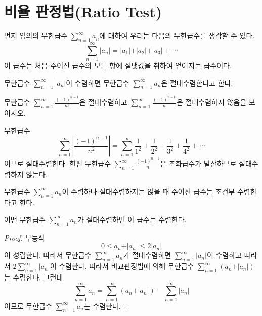 \documentclass[11pt, a4paper]{book}
\begin{document}
\section{비율 판정법(Ratio Test)}
먼저 임의의 무한급수 $\displaystyle \sum_{n=1}^{\infty}a_{n}$에 대하여 우리는 다음의 무한급수를 생각할 수 있다.
\begin{equation*}
	\sum_{n=1}^{\infty}\vert a_n \vert = \vert a_1 \vert + \vert a_2 \vert + \vert a_3 \vert + \, \cdots 
\end{equation*}
이 급수는 처음 주어진 급수의 모든 항에 절댓값을 취하여 얻어지는 급수이다.

\begin{definition}[절대수렴]
	무한급수 $\displaystyle \sum_{n=1}^{\infty}\vert a_n \vert$이 수렴하면 무한급수 $\displaystyle \sum_{n=1}^{\infty}a_{n}$은 {\color{red}절대수렴}한다고 한다.
\end{definition}
\vspace{1em}
\begin{example}
	무한급수 $\displaystyle \sum_{n=1}^{\infty}\frac{(-1)^{n-1}}{n^{2}}$은 절대수렴하고 $\displaystyle \sum_{n=1}^{\infty}\frac{(-1)^{n-1}}{n}$은 절대수렴하지 않음을 보이시오.
	\begin{solution}
		무한급수
		\begin{equation*}
			\sum_{n=1}^{\infty}\left| \frac{(-1)^{n-1}}{n^{2}}\right|  =\sum_{n=1}^{\infty} \frac{1}{1^2} +\frac{1}{2^2} +\frac{1}{3^{2}} +\frac{1}{4^2} + \, \cdots
		\end{equation*}
	이므로 절대수렴한다. 한편 무한급수 $\displaystyle \sum_{n=1}^{\infty}\frac{(-1)^{n-1}}{n}$은 조화급수가 발산하므로 절대수렴하지 않는다.
	\end{solution}
\end{example}
\vspace{1em}
\begin{definition}[조건부 수렴]
	무한급수 $\displaystyle \sum_{n=1}^{\infty}a_{n}$이 수렴하나 절대수렴하지는 않을 때 주어진 급수는 {\color{red}조건부 수렴}한다고 한다.
\end{definition}
\vspace{1em}
\begin{theorem}
	어떤 무한급수 $\displaystyle \sum_{n=1}^{\infty}a_{n}$가 절대수렴하면 이 급수는 수렴한다.
\end{theorem}
\begin{proof}
	부등식
	\begin{equation*}
		0 \le a_n + \vert a_n \vert \le 2\vert a_n \vert
	\end{equation*}
이 성립한다. 따라서 무한급수 $\displaystyle \sum_{n=1}^{\infty}a_{n}$가 절대수렴하면 $\displaystyle \sum_{n=1}^{\infty}\vert a_n \vert$이 수렴하고 따라서 $2 \displaystyle \sum_{n=1}^{\infty}\vert a_n \vert$이 수렴한다. 따라서 비교판정법에 의해 무한급수 $\displaystyle \sum_{n=1}^{\infty}\left(a_n + \vert a_n \vert \right)$는 수렴한다. 그런데
\begin{equation*}
	\sum_{n=1}^{\infty}a_{n} =\sum_{n=1}^{\infty}\left(a_n + \vert a_n \vert \right) - \sum_{n=1}^{\infty}\vert a_n \vert
\end{equation*}
이므로 무한급수 $\displaystyle \sum_{n=1}^{\infty}a_{n}$는 수렴한다.
\end{proof}
\vspace{1em}
\end{document}
